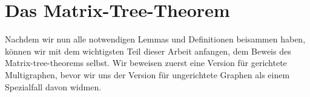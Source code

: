 \section{Das Matrix-Tree-Theorem}

Nachdem wir nun alle notwendigen Lemmas und Definitionen beisammen haben, können wir mit dem wichtigsten Teil dieser Arbeit anfangen, dem Beweis des Matrix-tree-theorems selbst. Wir beweisen zuerst eine Version für gerichtete Multigraphen, bevor wir uns der Version für ungerichtete Graphen als einem Spezialfall davon widmen.



